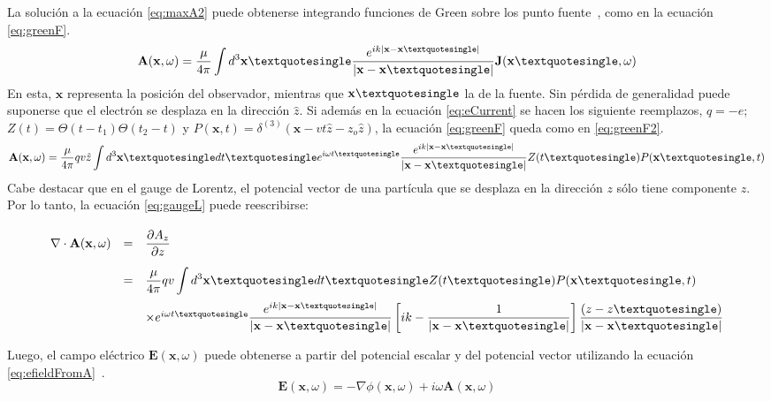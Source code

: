La soluci\'on a la ecuaci\'on \ref{eq:maxA2} puede obtenerse integrando funciones de Green sobre los punto fuente~\cite{jackson:1998}, como en la ecuaci\'on \ref{eq:greenF}.
%
\begin{equation}
\mathbf{A}(\mathbf{x},\omega)=\frac{\mu}{4\pi}\int d^3\mathbf{x}\textquotesingle
\frac{e^{ik|\mathbf{x}-\mathbf{x}\textquotesingle|}}{|\mathbf{x}-\mathbf{x}\textquotesingle|}
\mathbf{J}(\mathbf{x}\textquotesingle,\omega)
\label{eq:greenF}
\end{equation}
%
En esta, $\mathbf{x}$ representa la posici\'on del observador, mientras que $\mathbf{x}\textquotesingle$ la de la fuente.
Sin p\'erdida de generalidad puede suponerse que el electr\'on se desplaza en la direcci\'on $\hat z$. Si adem\'as en la ecuaci\'on \ref{eq:eCurrent} se hacen los siguiente reemplazos, $q=-e$; $Z(t)=\Theta(t-t_1)\Theta(t_2-t)$ y $P(\mathbf{x},t)=\delta^{(3)}(\mathbf{x}-vt\hat z-z_o\hat z)$, la ecuaci\'on \ref{eq:greenF} queda como en \ref{eq:greenF2}.
%
\begin{equation}
\mathbf{A}(\mathbf{x},\omega)=\frac{\mu}{4\pi}
qv\hat z
\int d^3\mathbf{x}\textquotesingle
dt\textquotesingle e^{i\omega t\textquotesingle}
\frac{e^{ik|\mathbf{x}-\mathbf{x}\textquotesingle|}}{|\mathbf{x}-\mathbf{x}\textquotesingle|}
Z(t\textquotesingle)P(\mathbf{x}\textquotesingle,t)
\label{eq:greenF2}
\end{equation}
%
Cabe destacar que en el gauge de Lorentz, el potencial vector de una part\'icula que se desplaza en la direcci\'on $z$ s\'olo tiene componente $z$. Por lo tanto, la ecuaci\'on \ref{eq:gaugeL} puede reescribirse:
%
\begin{equation}
	\renewcommand{\arraystretch}{2.5}
	\begin{array}{rcl}
	\nabla\cdot\mathbf{A}(\mathbf{x},\omega)&=&\dfrac{\partial A_z}{\partial z}\\
	&=&
	\dfrac{\mu}{4\pi}qv
	\displaystyle\int d^3\mathbf{x}\textquotesingle dt\textquotesingle
	Z(t\textquotesingle)P(\mathbf{x}\textquotesingle,t)\\
	& & \times
	e^{i\omega t\textquotesingle}
	\dfrac{e^{ik|\mathbf{x}-\mathbf{x}\textquotesingle|}}{|\mathbf{x}-\mathbf{x}\textquotesingle|}
	\left[ik-\dfrac{1}{|\mathbf{x}-\mathbf{x}\textquotesingle|}\right]
	\dfrac{(z-z\textquotesingle)}{|\mathbf{x}-\mathbf{x}\textquotesingle|}
	\end{array}
\label{eq:gaugeL2}
\end{equation}
%

Luego, el campo el\'ectrico $\mathbf{E}(\mathbf{x},\omega)$ puede obtenerse a partir del potencial escalar y del potencial vector utilizando la ecuaci\'on \ref{eq:efieldFromA}~\cite{jackson:1998}.
%
\begin{equation}
	\mathbf{E}(\mathbf{x},\omega) = 
	-\nabla\phi(\mathbf{x},\omega) 
	+
	i\omega\mathbf{A}(\mathbf{x},\omega)
	\label{eq:efieldFromA}
\end{equation}
%

